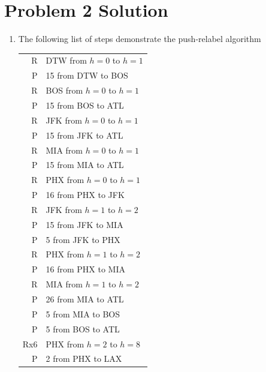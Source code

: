 \documentclass{article}
\begin{document}
\section*{Problem 2 Solution}

\begin{enumerate}
    \item The following list of steps demonstrate the push-relabel algorithm

    \begin{center}
        \begin{tabular}{r | l}
            R & DTW from $h = 0$ to $h = 1$ \\
            P & 15 from DTW to BOS \\
            R & BOS from $h = 0$ to $h = 1$ \\
            P & 15 from BOS to ATL \\
            R & JFK from $h = 0$ to $h = 1$ \\
            P & 15 from JFK to ATL \\
            R & MIA from $h = 0$ to $h = 1$ \\
            P & 15 from MIA to ATL \\
            R & PHX from $h = 0$ to $h = 1$ \\
            P & 16 from PHX to JFK \\
            R & JFK from $h = 1$ to $h = 2$ \\
            P & 15 from JFK to MIA \\
            P & 5 from JFK to PHX \\
            R & PHX from $h = 1$ to $h = 2$ \\
            P & 16 from PHX to MIA \\
            R & MIA from $h = 1$ to $h = 2$ \\
            P & 26 from MIA to ATL \\
            P & 5 from MIA to BOS \\
            P & 5 from BOS to ATL \\
            Rx6 & PHX from $h = 2$ to $h = 8$ \\
            P & 2 from PHX to LAX
        \end{tabular}
    \end{center}
\end{enumerate}
\end{document}
